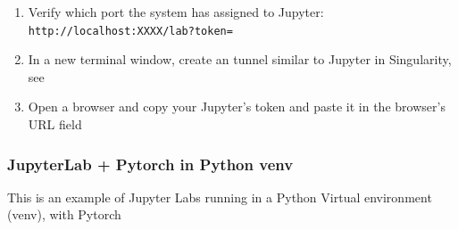 \begin{itemize}
\begin{enumerate}
		\item Verify which port the system has assigned to Jupyter: \texttt{http://localhost:XXXX/lab?token=}
		\item In a new terminal window, create an  tunnel similar to Jupyter in Singularity, see 
		\item Open a browser and copy your Jupyter's token and paste it in the browser's URL field
	\end{enumerate}
\end{itemize}

\subsubsection{JupyterLab + Pytorch in Python venv}
\label{sect:jupiterlabs-venv}

This is an example of Jupyter Labs running in a Python Virtual environment (venv), with Pytorch

